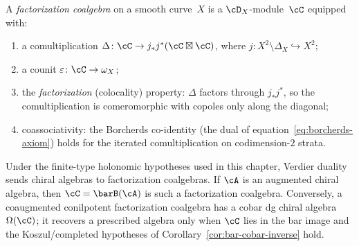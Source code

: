 \begin{definition}\label{def:factorization-coalgebra}
A \emph{factorization coalgebra} on a smooth
curve~$X$ is a $\cD_X$-module~$\cC$ equipped with:
\begin{enumerate}[label=\textup{(\roman*)}]
\item a comultiplication
 $\Delta \colon \cC \to
 j_* j^*(\cC \boxtimes \cC)$, where
 $j \colon X^2 \setminus \Delta_X \hookrightarrow X^2$;
\item a counit
 $\varepsilon \colon \cC \to \omega_X$;
\item the \emph{factorization} (colocality) property:
 $\Delta$ factors through $j_* j^*$, so the
 comultiplication is comeromorphic with copoles only
 along the diagonal;
\item coassociativity: the Borcherds co-identity
 (the dual of
 equation~\eqref{eq:borcherds-axiom}) holds for the
 iterated comultiplication on codimension-$2$ strata.
\end{enumerate}
Under the finite-type holonomic hypotheses used in this chapter,
Verdier duality sends chiral algebras to factorization coalgebras.
If $\cA$ is an augmented chiral algebra, then
$\cC=\barB(\cA)$ is such a factorization coalgebra. Conversely, a
coaugmented conilpotent factorization coalgebra has a cobar
dg chiral algebra $\Omega(\cC)$; it recovers a prescribed algebra only
when $\cC$ lies in the bar image and the Koszul/completed hypotheses of
Corollary~\ref{cor:bar-cobar-inverse} hold.
\end{definition}

